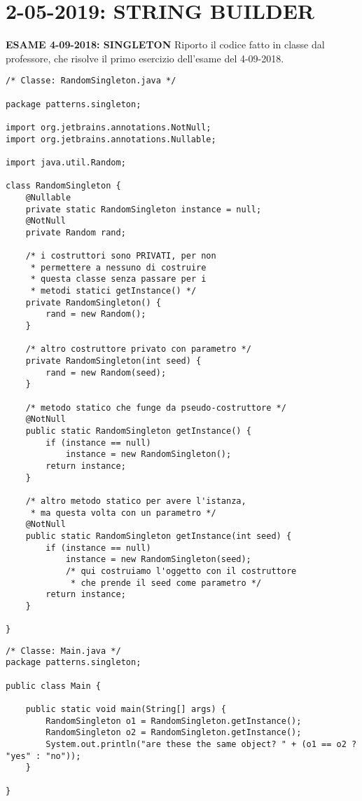

\newpage
\section{2-05-2019: STRING BUILDER}
\noindent \textbf{ESAME 4-09-2018: SINGLETON} \newline
Riporto il codice fatto in classe dal professore, che risolve il primo esercizio dell'esame del 4-09-2018.
\begin{lstlisting}
/* Classe: RandomSingleton.java */

package patterns.singleton;

import org.jetbrains.annotations.NotNull;
import org.jetbrains.annotations.Nullable;

import java.util.Random;

class RandomSingleton {
    @Nullable
    private static RandomSingleton instance = null;
    @NotNull
    private Random rand;

    /* i costruttori sono PRIVATI, per non
     * permettere a nessuno di costruire
     * questa classe senza passare per i 
     * metodi statici getInstance() */
    private RandomSingleton() {
        rand = new Random();
    }

    /* altro costruttore privato con parametro */
    private RandomSingleton(int seed) {
        rand = new Random(seed);
    }

    /* metodo statico che funge da pseudo-costruttore */
    @NotNull
    public static RandomSingleton getInstance() {
        if (instance == null)
            instance = new RandomSingleton();
        return instance;
    }

    /* altro metodo statico per avere l'istanza, 
     * ma questa volta con un parametro */
    @NotNull
    public static RandomSingleton getInstance(int seed) {
        if (instance == null)
            instance = new RandomSingleton(seed);   
            /* qui costruiamo l'oggetto con il costruttore
             * che prende il seed come parametro */
        return instance;
    }

}
\end{lstlisting}


\begin{lstlisting}
/* Classe: Main.java */
package patterns.singleton;

public class Main {

    public static void main(String[] args) {
        RandomSingleton o1 = RandomSingleton.getInstance();
        RandomSingleton o2 = RandomSingleton.getInstance();
        System.out.println("are these the same object? " + (o1 == o2 ? "yes" : "no"));
    }

}
\end{lstlisting}

